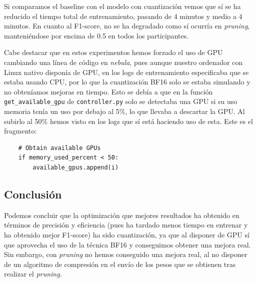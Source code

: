 Si comparamos el baseline con el modelo con cuantización vemos que sí se ha reducido el tiempo total de entrenamiento, 
pasando de 4 minutos y medio a 4 minutos. En cuanto al F1-score, no se ha degradado como sí ocurría en \textit{pruning},
manteniéndose por encima de 0.5 en todos los participantes.
\vspace{1mm}

Cabe destacar que en estos experimentos hemos forzado el uso de GPU cambiando una línea de código en \textit{nebula}, 
pues aunque nuestro ordenador con Linux nativo disponía de GPU, en los logs de entrenamiento especificaba que se estaba
usando CPU, por lo que la cuantización BF16 solo se estaba simulando y no obteníamos mejoras en tiempo. Esto se debía a que en la función \texttt{get\_available\_gpu} de \texttt{controller.py} solo se detectaba una GPU si 
su uso memoria tenía un uso por debajo al 5\%, lo que llevaba a descartar la GPU. Al subirlo al 50\% hemos visto en los
logs que sí está haciendo uso de esta. Este es el fragmento: 
\begin{verbatim}
    # Obtain available GPUs
    if memory_used_percent < 50:
        available_gpus.append(i)
\end{verbatim}

\subsection{Conclusión}
Podemos concluir que la optimización que mejores resultados ha obtenido en términos de precisión y eficiencia
(pues ha tardado menos tiempo en entrenar y ha obtenido mejor F1-score) ha sido cuantización, ya que al disponer
de GPU sí que aprovecha el uso de la técnica BF16 y conseguimos obtener una mejora real. Sin embargo, con \textit{pruning} 
no hemos conseguido una mejora real, al no disponer de un algoritmo de compresión en el envío de los pesos que se obtienen 
tras realizar el \textit{pruning}.


